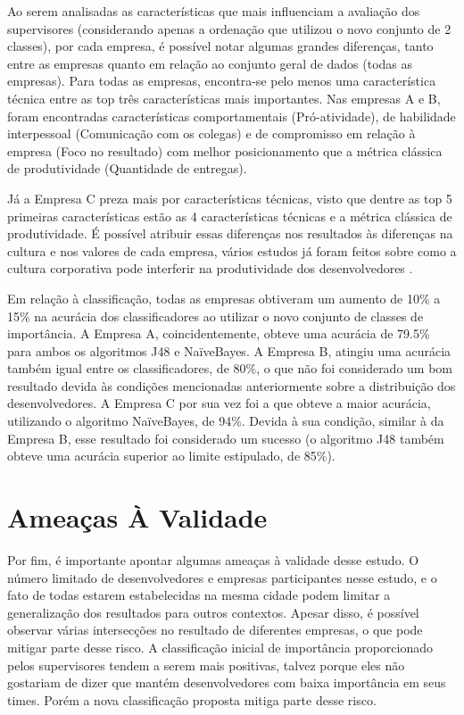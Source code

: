 Ao serem analisadas as características que mais influenciam a avaliação dos supervisores (considerando apenas a ordenação que utilizou o novo conjunto de 2 classes), por cada empresa, é possível notar algumas grandes diferenças, tanto entre as empresas quanto em relação ao conjunto geral de dados (todas as empresas). Para todas as empresas, encontra-se pelo menos uma característica técnica entre as top três características mais importantes. Nas empresas A e B, foram encontradas características comportamentais (Pró-atividade), de habilidade interpessoal (Comunicação com os colegas) e de compromisso em relação à empresa (Foco no resultado) com melhor posicionamento que a métrica clássica de produtividade (Quantidade de entregas).

Já a Empresa C preza mais por características técnicas, visto que dentre as top 5 primeiras características estão as 4 características técnicas e a métrica clássica de produtividade. É possível atribuir essas diferenças nos resultados às diferenças na cultura e nos valores de cada empresa, vários estudos já foram feitos sobre como a cultura corporativa pode interferir na produtividade dos desenvolvedores \cite{Edmans2011,Jones2000,Scudder1991,AgrellA.andGustafson1994,Guzzo1988,McLean1996,Turcotte2004}.

Em relação à classificação, todas as empresas obtiveram um aumento de 10\% a 15\% na acurácia dos classificadores ao utilizar o novo conjunto de classes de importância. A Empresa A, coincidentemente, obteve uma acurácia de 79.5\% para ambos os algoritmos J48 e NaïveBayes. A Empresa B, atingiu uma acurácia também igual entre os classificadores, de 80\%, o que não foi considerado um bom resultado devida às condições mencionadas anteriormente sobre a distribuição dos desenvolvedores. A Empresa C por sua vez foi a que obteve a maior acurácia, utilizando o algoritmo NaïveBayes, de 94\%. Devida à sua condição, similar à da Empresa B, esse resultado foi considerado um sucesso (o algoritmo J48 também obteve uma acurácia superior ao limite estipulado, de 85\%).

\section{Ameaças À Validade}

Por fim, é importante apontar algumas ameaças à validade desse estudo. O número limitado de desenvolvedores e empresas participantes nesse estudo, e o fato de todas estarem estabelecidas na mesma cidade podem limitar a generalização dos resultados para outros contextos. Apesar disso, é possível observar várias intersecções no resultado de diferentes empresas, o que pode mitigar parte desse risco. A classificação inicial de importância proporcionado pelos supervisores tendem a serem mais positivas, talvez porque eles não gostariam de dizer que mantém desenvolvedores com baixa importância em seus times. Porém a nova classificação proposta mitiga parte desse risco.

